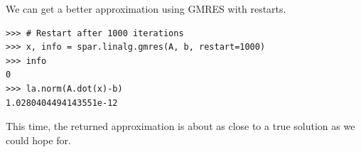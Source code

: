 We can get a better approximation using GMRES with restarts. 
\begin{lstlisting}
>>> # Restart after 1000 iterations
>>> x, info = spar.linalg.gmres(A, b, restart=1000)
>>> info
0
>>> la.norm(A.dot(x)-b)
1.0280404494143551e-12
\end{lstlisting}
This time, the returned approximation  is about as close to a true solution as we could hope for.


